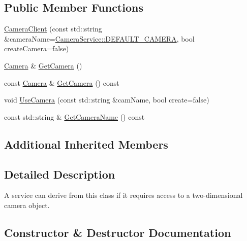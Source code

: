 \subsection*{Public Member Functions}
\begin{DoxyCompactItemize}
\item 
\hyperlink{classastu_1_1suite2d_1_1CameraClient_abed64b5a569bcdce2303bd929958eb8c}{Camera\+Client} (const std\+::string \&camera\+Name=\hyperlink{classastu_1_1suite2d_1_1CameraService_ae92f5163a54b2ab8dd738cadee8f75eb}{Camera\+Service\+::\+D\+E\+F\+A\+U\+L\+T\+\_\+\+C\+A\+M\+E\+RA}, bool create\+Camera=false)
\item 
\hyperlink{classastu_1_1suite2d_1_1Camera}{Camera} \& \hyperlink{classastu_1_1suite2d_1_1CameraClient_ac305ddbdf19d60d260a0d8af57d8a1d0}{Get\+Camera} ()
\item 
const \hyperlink{classastu_1_1suite2d_1_1Camera}{Camera} \& \hyperlink{classastu_1_1suite2d_1_1CameraClient_ae5a13bfdb3cd466404c94546bb2aeaff}{Get\+Camera} () const
\item 
void \hyperlink{classastu_1_1suite2d_1_1CameraClient_a729197722ac1f2d71f0f11708eef6204}{Use\+Camera} (const std\+::string \&cam\+Name, bool create=false)
\item 
const std\+::string \& \hyperlink{classastu_1_1suite2d_1_1CameraClient_a24450a64720a3f05ba457082171ee5f8}{Get\+Camera\+Name} () const
\end{DoxyCompactItemize}
\subsection*{Additional Inherited Members}


\subsection{Detailed Description}
A service can derive from this class if it requires access to a two-\/dimensional camera object. 

\subsection{Constructor \& Destructor Documentation}
\mbox{\label{classastu_1_1suite2d_1_1CameraClient_abed64b5a569bcdce2303bd929958eb8c}} 
